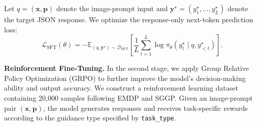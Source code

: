 \documentclass{article} %
\begin{document}
Let $q=(\mathbf{x},\mathbf{p})$ denote the image-prompt input and
$\mathbf{y}^{\star}=(y^{\star}_1,\ldots,y^{\star}_L)$ denote the target JSON response.
We optimize the response-only next-token prediction loss:
\begin{equation}
\mathcal{L}_{\mathrm{SFT}}(\theta)
=
-\mathbb{E}_{(q,\mathbf{y}^{\star})\sim\mathcal{D}_{\mathrm{SFT}}}
\left[
\frac{1}{L}
\sum_{t=1}^{L}
\log
\pi_{\theta}
\left(
y^{\star}_t
\mid q,y^{\star}_{<t}
\right)
\right].
\end{equation}

\textbf{Reinforcement Fine-Tuning.}
In the second stage, we apply Group Relative Policy Optimization (GRPO) to further improve the model's decision-making ability and output accuracy. We construct a reinforcement learning dataset containing 20,000 samples following EMDP and SGGP. Given an image-prompt pair $(\mathbf{x}, \mathbf{p})$, the model generates responses and receives task-specific rewards according to the guidance type specified by \texttt{task\_type}.
\end{document}
